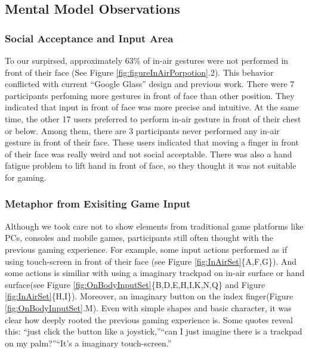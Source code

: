\documentclass{sigchi}
\begin{document}
  \subsection{Mental Model Observations}
    \subsubsection{Social Acceptance and Input Area}
    To our surpirsed, approximately 63\% of in-air gestures were not performed in front of their face (See Figure \ref{fig:figureInAirPorpotion}.2). This behavior conflicted with current ``Google Glass'' design and previous work\cite{Colaco:2013:MCL:2501988.2502042}. There were 7 participants perfoming more gestures in front of face than other position. They indicated that input in front of face was more precise and intuitive. At the same time, the other 17 users preferred to perform in-air gesture in front of their chest or below. Among them, there are 3 participants never performed any in-air gesture in front of their face. These users indicated that moving a finger in front of their face was really weird and not social acceptable. There was also a hand fatigue problem to lift hand in front of face, so they thought it was not suitable for gaming.

    \subsubsection{Metaphor from Exisiting Game Input}
    Although we took care not to show elements from traditional game platforms like PCs, consoles and mobile games, participants still often thought with the previous gaming experience. For example, some input actions performed as if using touch-screen in front of their face (see Figure \ref{fig:InAirSet}\{A,F,G\}). And some actions is similiar with using a imaginary trackpad on in-air surface or hand surface(see Figure \ref{fig:OnBodyInputSet}\{B,D,E,H,I,K,N,Q\} and Figure \ref{fig:InAirSet}\{H,I\}). Moreover, an imaginary button on the index finger(Figure \ref{fig:OnBodyInputSet}.M). Even with simple shapes and basic character, it was clear how deeply rooted the previous gaming experience is. Some quotes reveal this: ``just click the button like a joystick,''``can I just imagine there is a trackpad on my palm?''``It's a imaginary touch-screen.''
\end{document}
